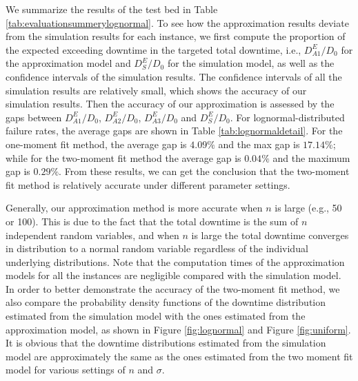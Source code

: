 \documentclass[preprint,12pt]{elsarticle}
\begin{document}
We summarize the results of the test bed in Table \ref{tab:evaluationsummerylognormal}. To see how the approximation results deviate from the simulation results for each instance, we first compute the proportion of the expected exceeding downtime in the targeted total downtime, i.e., $D_{A1}^{E}/D_0$ for the approximation model and $D_{S}^{E}/D_0$ for the simulation model, as well as the confidence intervals of the simulation results. The confidence intervals of all the simulation results are relatively small, which shows the accuracy of our simulation results. Then the accuracy of our approximation is assessed by the gaps between $D_{A1}^{E}/D_0$, $D_{A2}^{E}/D_0$, $D_{A3}^{E}/D_0$ and $D_{S}^{E}/D_0$. For lognormal-distributed failure rates, the average gaps are shown in Table \ref{tab:lognormaldetail}. For the one-moment fit method, the average gap is $4.09\%$ and the max gap is $17.14\%$; while for the two-moment fit method the average gap is $0.04\%$ and the maximum gap is $0.29\%$. From these results, we can get the conclusion that the two-moment fit method is relatively accurate under different parameter settings. %


Generally, our approximation method is more accurate when $n$ is large (e.g., 50 or 100). This is due to the fact that the total downtime is the sum of $n$ independent random variables, and when $n$ is large the total downtime converges in distribution to a normal random variable regardless of the individual underlying distributions. Note that the computation times of the approximation models for all the instances are negligible compared with the simulation model. In order to better demonstrate the accuracy of the two-moment fit method, we also compare the probability density functions of the downtime distribution estimated from the simulation model with the ones estimated from the approximation model, as shown in Figure \ref{fig:lognormal} and Figure \ref{fig:uniform}. It is obvious that the downtime distributions estimated from the simulation model are approximately the same as the ones estimated from the two moment fit model for various settings of $n$ and $\sigma$.
\end{document}
